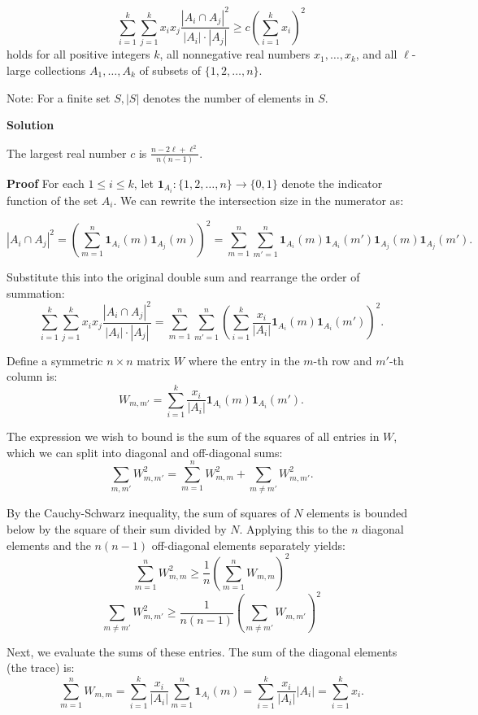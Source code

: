 \begin{enumerate}
 \[\sum_{i=1}^k \sum_{j=1}^k x_i x_j \frac{\left|A_i \cap A_j\right|^2}{\left|A_i\right| \cdot\left|A_j\right|} \geq c\left(\sum_{i=1}^k x_i\right)^2\]
holds for all positive integers $k$, all nonnegative real numbers $x_1, \ldots, x_k$, and all $\ell$-large collections $A_1, \ldots, A_k$ of subsets of $\{1,2, \ldots, n\}$.


 Note: For a finite set $S,|S|$ denotes the number of elements in $S$.


 



\textbf{Solution}

The largest real number $c$ is $\frac{n - 2\ell + \ell^2}{n(n-1)}$.

 \textbf{Proof} For each $1 \leq i \leq k$, let $\mathbf{1}_{A_i} : \{1, 2, \ldots, n\} \to \{0, 1\}$ denote the indicator function of the set $A_i$. We can rewrite the intersection size in the numerator as:

 
 \[|A_i \cap A_j|^2 = \left( \sum_{m=1}^n \mathbf{1}_{A_i}(m) \mathbf{1}_{A_j}(m) \right)^2 = \sum_{m=1}^n \sum_{m'=1}^n \mathbf{1}_{A_i}(m) \mathbf{1}_{A_i}(m') \mathbf{1}_{A_j}(m) \mathbf{1}_{A_j}(m').\]

 Substitute this into the original double sum and rearrange the order of summation:
 \[\sum_{i=1}^k \sum_{j=1}^k x_i x_j \frac{|A_i \cap A_j|^2}{|A_i| \cdot |A_j|} = \sum_{m=1}^n \sum_{m'=1}^n \left( \sum_{i=1}^k \frac{x_i}{|A_i|} \mathbf{1}_{A_i}(m) \mathbf{1}_{A_i}(m') \right)^2.\]

 Define a symmetric $n \times n$ matrix $W$ where the entry in the $m$-th row and $m'$-th column is:
 \[W_{m, m'} = \sum_{i=1}^k \frac{x_i}{|A_i|} \mathbf{1}_{A_i}(m) \mathbf{1}_{A_i}(m').\]

 The expression we wish to bound is the sum of the squares of all entries in $W$, which we can split into diagonal and off-diagonal sums:
 \[\sum_{m, m'} W_{m, m'}^2 = \sum_{m=1}^n W_{m,m}^2 + \sum_{m \neq m'} W_{m, m'}^2.\]

 By the Cauchy-Schwarz inequality, the sum of squares of $N$ elements is bounded below by the square of their sum divided by $N$. Applying this to the $n$ diagonal elements and the $n(n-1)$ off-diagonal elements separately yields:
 \[\sum_{m=1}^n W_{m,m}^2 \geq \frac{1}{n} \left( \sum_{m=1}^n W_{m,m} \right)^2\]
 \[\sum_{m \neq m'} W_{m,m'}^2 \geq \frac{1}{n(n-1)} \left( \sum_{m \neq m'} W_{m,m'} \right)^2\]

 Next, we evaluate the sums of these entries. The sum of the diagonal elements (the trace) is:
 \[\sum_{m=1}^n W_{m,m} = \sum_{i=1}^k \frac{x_i}{|A_i|} \sum_{m=1}^n \mathbf{1}_{A_i}(m) = \sum_{i=1}^k \frac{x_i}{|A_i|} |A_i| = \sum_{i=1}^k x_i.\]


\end{enumerate}

